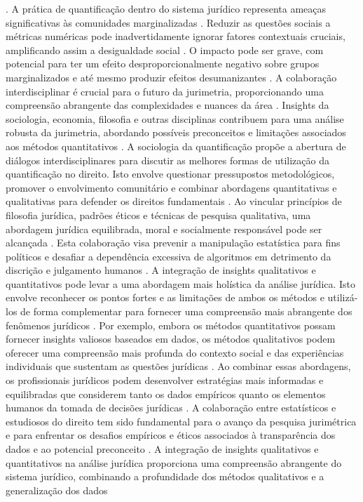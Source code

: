 \begin{agradecimentos}
\cite{10.1057/s41599-020-00557-0,10.5040/9781350220645}. A prática de quantificação dentro do sistema jurídico representa ameaças significativas às comunidades marginalizadas \cite{10.1057/s41599-020-00557-0,10.1057/s41599-020-0396-5}. Reduzir as questões sociais a métricas numéricas pode inadvertidamente ignorar fatores contextuais cruciais, amplificando assim a desigualdade social \cite{10.1057/s41599-020-00557-0,10.1057/s41599-020-0396-5}. O impacto pode ser grave, com potencial para ter um efeito desproporcionalmente negativo sobre grupos marginalizados e até mesmo produzir efeitos desumanizantes \cite{10.1057/s41599-020-0396-5,10.1057/s41599-020-00557-0}. A colaboração interdisciplinar é crucial para o futuro da jurimetria, proporcionando uma compreensão abrangente das complexidades e nuances da área \cite{silva2023role,nunes2016jurimetria}. Insights da sociologia, economia, filosofia e outras disciplinas contribuem para uma análise robusta da jurimetria, abordando possíveis preconceitos e limitações associados aos métodos quantitativos \cite{silva2023role,nunes2016jurimetria}. A sociologia da quantificação propõe a abertura de diálogos interdisciplinares para discutir as melhores formas de utilização da quantificação no direito. Isto envolve questionar pressupostos metodológicos, promover o envolvimento comunitário e combinar abordagens quantitativas e qualitativas para defender os direitos fundamentais \cite{10.1007/s11186-021-09453-1,1023071190721}. Ao vincular princípios de filosofia jurídica, padrões éticos e técnicas de pesquisa qualitativa, uma abordagem jurídica equilibrada, moral e socialmente responsável pode ser alcançada \cite{10.1007/s11186-021-09453-1,1023071190721}. Esta colaboração visa prevenir a manipulação estatística para fins políticos e desafiar a dependência excessiva de algoritmos em detrimento da discrição e julgamento humanos \cite{10.1007/s11186-021-09453-1,1023071190721}. A integração de insights qualitativos e quantitativos pode levar a uma abordagem mais holística da análise jurídica. Isto envolve reconhecer os pontos fortes e as limitações de ambos os métodos e utilizá-los de forma complementar para fornecer uma compreensão mais abrangente dos fenômenos jurídicos \cite{10.1057/s41599-020-00557-0}. Por exemplo, embora os métodos quantitativos possam fornecer insights valiosos baseados em dados, os métodos qualitativos podem oferecer uma compreensão mais profunda do contexto social e das experiências individuais que sustentam as questões jurídicas \cite{10.1057/s41599-020-00557-0}. Ao combinar essas abordagens, os profissionais jurídicos podem desenvolver estratégias mais informadas e equilibradas que considerem tanto os dados empíricos quanto os elementos humanos da tomada de decisões jurídicas \cite{10.1057/s41599-020-00557-0}. A colaboração entre estatísticos e estudiosos do direito tem sido fundamental para o avanço da pesquisa jurimétrica e para enfrentar os desafios empíricos e éticos associados à transparência dos dados e ao potencial preconceito \cite{10.1007/s11186-021-09453-1,10.3390/fi9040068}. A integração de insights qualitativos e quantitativos na análise jurídica proporciona uma compreensão abrangente do sistema jurídico, combinando a profundidade dos métodos qualitativos e a generalização dos dados 
\end{agradecimentos}
